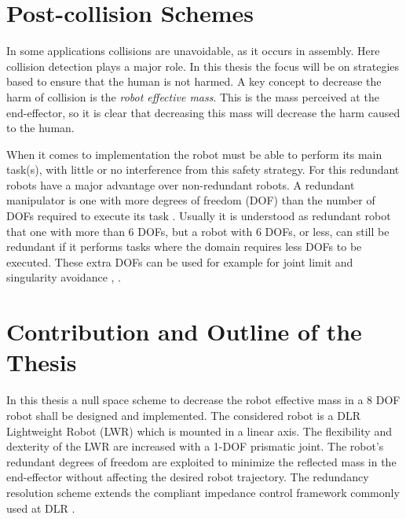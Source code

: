 \section{Post-collision Schemes}
\label{sec:decreasing_harm}

In some applications collisions are unavoidable, as it occurs in assembly. Here collision detection plays a major role. In this thesis the focus will be on strategies based to ensure that the human is not harmed. A key concept to decrease the harm of collision is the \textit{robot effective mass}. This is the mass perceived at the end-effector, so it is clear that decreasing this mass will decrease the harm caused to the human.



When it comes to implementation the  robot must be able to perform its main task(s), with little or no interference from this safety strategy.
For this redundant robots have a major advantage over non-redundant robots. 	A redundant manipulator is one with more degrees of freedom (DOF) than the number of DOFs required to execute its task \cite{redundant}. Usually it is understood as redundant robot that one with more than 6 DOFs, but a robot with 6 DOFs, or less, can still be redundant if it performs tasks where the domain requires less DOFs to be executed. These extra DOFs can be used for example for joint limit and singularity avoidance \cite{JLA_1}, \cite{redundant}.





\section{Contribution and Outline of the Thesis}
\label{sec:contribution_intro}

In this thesis a null space scheme to decrease the robot effective mass in a 8 DOF robot shall be designed and implemented.
The considered robot is a DLR Lightweight Robot (LWR) which is mounted in a linear axis. The flexibility and dexterity of the LWR are increased with a 1-DOF prismatic joint. The robot’s redundant degrees of freedom are exploited to minimize the reflected mass in the end-effector without affecting the desired robot trajectory. The redundancy resolution scheme extends the compliant impedance control framework commonly used at DLR \cite{citeulike:11821616}. 

